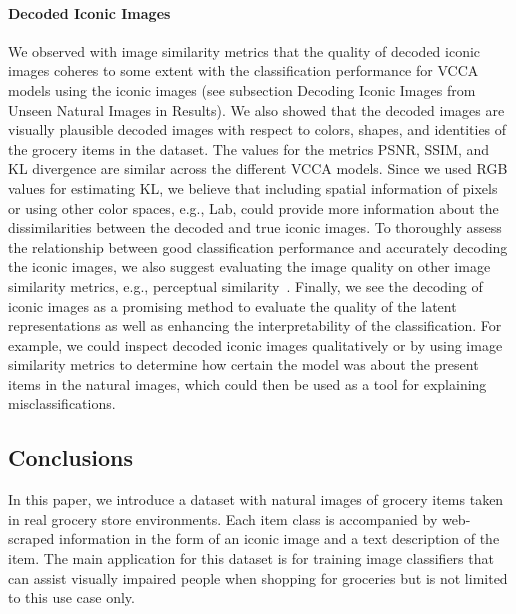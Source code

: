 \paragraph{Decoded Iconic Images} %
We observed with image similarity metrics that the quality of decoded iconic images coheres to some extent with the classification performance for VCCA models using the iconic images (see subsection Decoding Iconic Images from Unseen Natural Images in Results). We also showed that the decoded images are visually plausible decoded images with respect to colors, shapes, and identities of the grocery items in the dataset. The values for the metrics PSNR, SSIM, and KL divergence are similar across the different VCCA models. Since we used RGB values for estimating KL, we believe that including spatial information of pixels or using other color spaces, e.g., Lab, could provide more information about the dissimilarities between the decoded and true iconic images. To thoroughly assess the relationship between good classification performance and accurately decoding the iconic images, we also suggest evaluating the image quality on other image similarity metrics, e.g., perceptual similarity~\cite{zhang2018unreasonable}. Finally, we see the decoding of iconic images as a promising method to evaluate the quality of the latent representations as well as enhancing the interpretability of the classification. For example, we could inspect decoded iconic images qualitatively or by using image similarity metrics to determine how certain the model was about the present items in the natural images, which could then be used as a tool for explaining misclassifications.

\subsection{Conclusions}
\label{sec:conclusions}

In this paper, we introduce a dataset with natural images of grocery items taken in real grocery store environments. Each item class is accompanied by web-scraped information in the form of an iconic image and a text description of the item. The main application for this dataset is for training image classifiers that can assist visually impaired people when shopping for groceries but is not limited to this use case only. 


